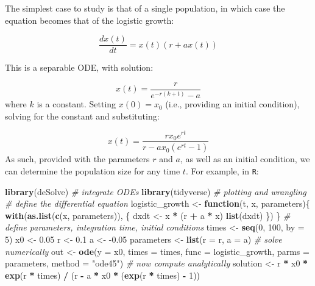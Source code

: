 \documentclass[]{book}
\newenvironment{Shaded}{\begin{snugshade}}{\end{snugshade}}
\newcommand{\CommentTok}[1]{\textcolor[rgb]{0.56,0.35,0.01}{\textit{#1}}}
\newcommand{\ControlFlowTok}[1]{\textcolor[rgb]{0.13,0.29,0.53}{\textbf{#1}}}
\newcommand{\DataTypeTok}[1]{\textcolor[rgb]{0.13,0.29,0.53}{#1}}
\newcommand{\DecValTok}[1]{\textcolor[rgb]{0.00,0.00,0.81}{#1}}
\newcommand{\FloatTok}[1]{\textcolor[rgb]{0.00,0.00,0.81}{#1}}
\newcommand{\KeywordTok}[1]{\textcolor[rgb]{0.13,0.29,0.53}{\textbf{#1}}}
\newcommand{\NormalTok}[1]{#1}
\newcommand{\OperatorTok}[1]{\textcolor[rgb]{0.81,0.36,0.00}{\textbf{#1}}}
\newcommand{\StringTok}[1]{\textcolor[rgb]{0.31,0.60,0.02}{#1}}
\begin{document}
The simplest case to study is that of a single population, in which case the equation becomes that of the logistic growth:

\[
\dfrac{dx(t)}{dt} = x(t)(r + a x(t))
\]

This is a separable ODE, with solution:

\[
x(t) = \frac{r}{e^{-r \left(k+t\right)}-a}
\]
where \(k\) is a constant. Setting \(x(0) = x_0\) (i.e., providing an initial condition), solving for the constant and substituting:

\[
x(t) = \frac{r {x_0} e^{r t}}{r-a {x_0} \left(e^{r t}-1\right)}
\]
As such, provided with the parameters \(r\) and \(a\), as well as an initial condition, we can determine the population size for any time \(t\). For example, in \texttt{R}:

\begin{Shaded}
\begin{Highlighting}[]
\KeywordTok{library}\NormalTok{(deSolve) }\CommentTok{# integrate ODEs}
\KeywordTok{library}\NormalTok{(tidyverse) }\CommentTok{# plotting and wrangling}
\CommentTok{# define the differential equation}
\NormalTok{logistic_growth <-}\StringTok{ }\ControlFlowTok{function}\NormalTok{(t, x, parameters)\{}
  \KeywordTok{with}\NormalTok{(}\KeywordTok{as.list}\NormalTok{(}\KeywordTok{c}\NormalTok{(x, parameters)), \{}
\NormalTok{    dxdt <-}\StringTok{ }\NormalTok{x }\OperatorTok{*}\StringTok{ }\NormalTok{(r }\OperatorTok{+}\StringTok{ }\NormalTok{a }\OperatorTok{*}\StringTok{ }\NormalTok{x)}
    \KeywordTok{list}\NormalTok{(dxdt)}
\NormalTok{  \})}
\NormalTok{\}}
\CommentTok{# define parameters, integration time, initial conditions}
\NormalTok{times <-}\StringTok{ }\KeywordTok{seq}\NormalTok{(}\DecValTok{0}\NormalTok{, }\DecValTok{100}\NormalTok{, }\DataTypeTok{by =} \DecValTok{5}\NormalTok{)}
\NormalTok{x0 <-}\StringTok{ }\FloatTok{0.05}
\NormalTok{r <-}\StringTok{ }\FloatTok{0.1}
\NormalTok{a <-}\StringTok{ }\FloatTok{-0.05}
\NormalTok{parameters <-}\StringTok{ }\KeywordTok{list}\NormalTok{(}\DataTypeTok{r =}\NormalTok{ r, }\DataTypeTok{a =}\NormalTok{ a)}
\CommentTok{# solve numerically}
\NormalTok{out <-}\StringTok{ }\KeywordTok{ode}\NormalTok{(}\DataTypeTok{y =}\NormalTok{ x0, }\DataTypeTok{times =}\NormalTok{ times, }
           \DataTypeTok{func =}\NormalTok{ logistic_growth, }\DataTypeTok{parms =}\NormalTok{ parameters, }
           \DataTypeTok{method =} \StringTok{"ode45"}\NormalTok{)}
\CommentTok{# now compute analytically}
\NormalTok{solution <-}\StringTok{ }\NormalTok{r }\OperatorTok{*}\StringTok{ }\NormalTok{x0 }\OperatorTok{*}\StringTok{ }\KeywordTok{exp}\NormalTok{(r }\OperatorTok{*}\StringTok{ }\NormalTok{times) }\OperatorTok{/}\StringTok{ }\NormalTok{(r }\OperatorTok{-}\StringTok{ }\NormalTok{a }\OperatorTok{*}\StringTok{ }\NormalTok{x0 }\OperatorTok{*}\StringTok{ }\NormalTok{(}\KeywordTok{exp}\NormalTok{(r }\OperatorTok{*}\StringTok{ }\NormalTok{times) }\OperatorTok{-}\StringTok{ }\DecValTok{1}\NormalTok{))}

\end{Highlighting}
\end{Shaded}
\end{document}
